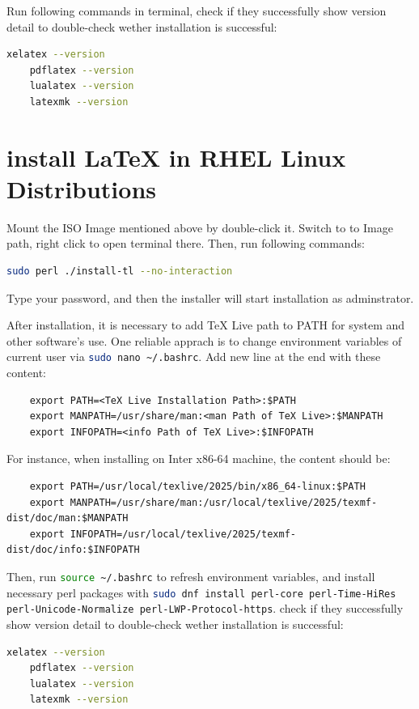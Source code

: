 Run following commands in terminal, check if they successfully show version detail to double-check wether installation is successful:
\begin{lstlisting}[language=bash]
    xelatex --version
    pdflatex --version
    lualatex --version
    latexmk --version
\end{lstlisting}

\section{install \LaTeX{} in RHEL Linux Distributions}
\label{Installation_LaTeX_RHEL}

Mount the ISO Image mentioned above by double-click it. Switch to to Image path, right click to open terminal there. Then, run following commands:
\begin{lstlisting}[language=bash]
    sudo perl ./install-tl --no-interaction
\end{lstlisting}

Type your password, and then the installer will start installation as adminstrator.

After installation, it is necessary to add TeX Live path to PATH for system and other software's use. One reliable apprach is to change environment variables of current user via \lstinline[language=bash]!sudo nano ~/.bashrc!. Add new line at the end with these content:
\begin{lstlisting}
    export PATH=<TeX Live Installation Path>:$PATH
    export MANPATH=/usr/share/man:<man Path of TeX Live>:$MANPATH
    export INFOPATH=<info Path of TeX Live>:$INFOPATH
\end{lstlisting}

For instance, when installing on Inter x86-64 machine, the content should be:
\begin{lstlisting}
    export PATH=/usr/local/texlive/2025/bin/x86_64-linux:$PATH
    export MANPATH=/usr/share/man:/usr/local/texlive/2025/texmf-dist/doc/man:$MANPATH
    export INFOPATH=/usr/local/texlive/2025/texmf-dist/doc/info:$INFOPATH
\end{lstlisting}

Then, run \lstinline[language=bash]!source ~/.bashrc! to refresh environment variables, and install necessary perl packages with \lstinline[language=bash]!sudo dnf install perl-core perl-Time-HiRes perl-Unicode-Normalize perl-LWP-Protocol-https!. check if they successfully show version detail to double-check wether installation is successful:
\begin{lstlisting}[language=bash]
    xelatex --version
    pdflatex --version
    lualatex --version
    latexmk --version
\end{lstlisting}

